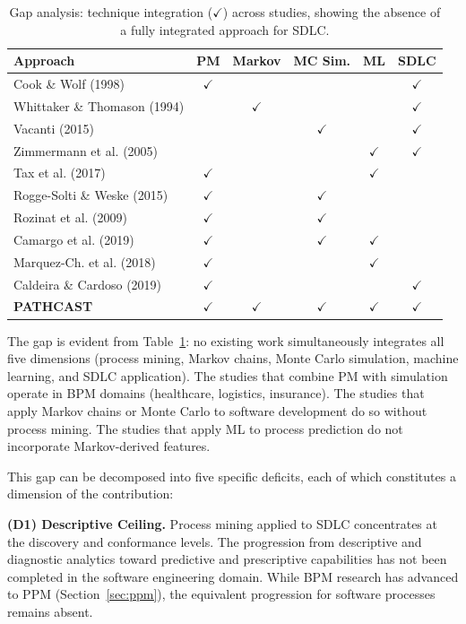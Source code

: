 \begin{table}[htb]
\centering
\caption{Gap analysis: technique integration ($\checkmark$) across
studies, showing the absence of a fully integrated approach for SDLC.}
\label{tab:gap}
\begin{tabular}{p{3.8cm}ccccc}
\toprule
\textbf{Approach} & \textbf{PM} & \textbf{Markov} &
\textbf{MC Sim.} & \textbf{ML} & \textbf{SDLC} \\
\midrule
Cook \& Wolf (1998) & $\checkmark$ & & & & $\checkmark$ \\
Whittaker \& Thomason (1994) & & $\checkmark$ & & & $\checkmark$ \\
Vacanti (2015) & & & $\checkmark$ & & $\checkmark$ \\
Zimmermann et al. (2005) & & & & $\checkmark$ & $\checkmark$ \\
Tax et al. (2017) & $\checkmark$ & & & $\checkmark$ & \\
Rogge-Solti \& Weske (2015) & $\checkmark$ & & $\checkmark$ & & \\
Rozinat et al. (2009) & $\checkmark$ & & $\checkmark$ & & \\
Camargo et al. (2019) & $\checkmark$ & & $\checkmark$ & $\checkmark$ & \\
Marquez-Ch. et al. (2018) & $\checkmark$ & & & $\checkmark$ & \\
Caldeira \& Cardoso (2019) & $\checkmark$ & & & & $\checkmark$ \\
\midrule
\textbf{PATHCAST} & $\boldsymbol{\checkmark}$ &
$\boldsymbol{\checkmark}$ & $\boldsymbol{\checkmark}$ &
$\boldsymbol{\checkmark}$ & $\boldsymbol{\checkmark}$ \\
\bottomrule
\end{tabular}
\end{table}

The gap is evident from Table~\ref{tab:gap}: no existing work
simultaneously integrates all five dimensions (process mining, Markov
chains, Monte Carlo simulation, machine learning, and SDLC application).
The studies that combine PM with simulation operate in BPM domains
(healthcare, logistics, insurance). The studies that apply Markov chains
or Monte Carlo to software development do so without process mining.
The studies that apply ML to process prediction do not incorporate
Markov-derived features.

This gap can be decomposed into five specific deficits, each of which
constitutes a dimension of the contribution:

\textbf{(D1) Descriptive Ceiling.} Process mining applied to SDLC
concentrates at the discovery and conformance levels. The progression from
descriptive and diagnostic analytics toward predictive and prescriptive
capabilities has not been completed in the software engineering domain.
While BPM research has advanced to PPM (Section~\ref{sec:ppm}), the
equivalent progression for software processes remains absent.

